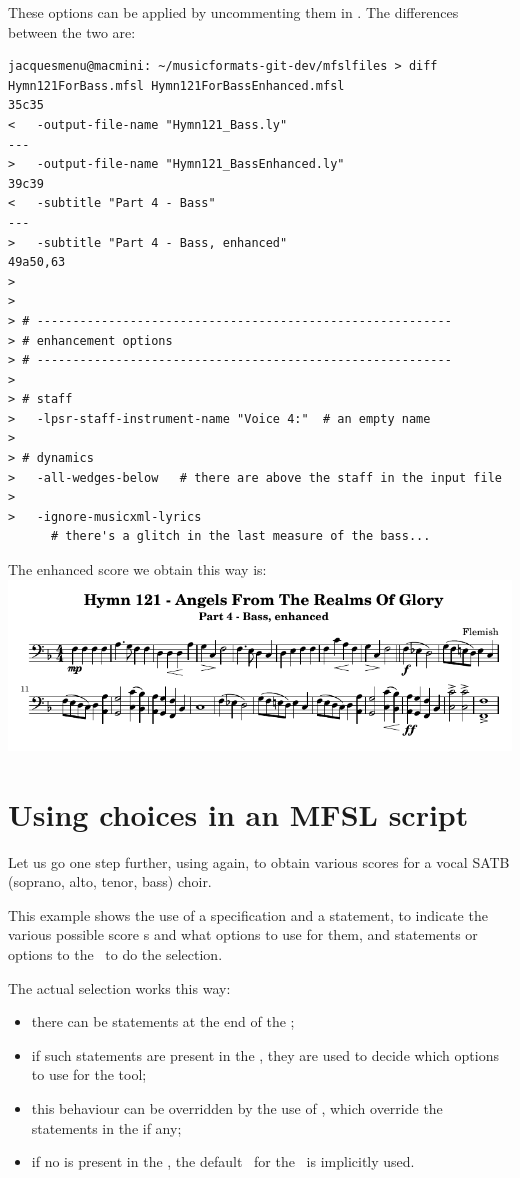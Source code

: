 These options can be applied by uncommenting them in . The differences between the two are:
\begin{lstlisting}[language=Terminal]
jacquesmenu@macmini: ~/musicformats-git-dev/mfslfiles > diff Hymn121ForBass.mfsl Hymn121ForBassEnhanced.mfsl
35c35
<   -output-file-name "Hymn121_Bass.ly"
---
>   -output-file-name "Hymn121_BassEnhanced.ly"
39c39
<   -subtitle "Part 4 - Bass"
---
>   -subtitle "Part 4 - Bass, enhanced"
49a50,63
>
>
> # ----------------------------------------------------------
> # enhancement options
> # ----------------------------------------------------------
>
> # staff
>   -lpsr-staff-instrument-name "Voice 4:"  # an empty name
>
> # dynamics
>   -all-wedges-below   # there are above the staff in the input file
>
>   -ignore-musicxml-lyrics
      # there's a glitch in the last measure of the bass...
\end{lstlisting}

The enhanced score we obtain this way is:\\
\includegraphics[scale=0.8]{../graphics/Hymn121_BassEnhanced.png}


\section{Using choices in an MFSL script}

Let us go one step further, using  again, to obtain various scores for a vocal SATB (soprano, alto, tenor, bass) choir.

This example shows the use of a  specification and a  statement, to indicate the various possible score \choice s and what options to use for them, and  statements or options to the \mfslInterp\ to do the selection.

The actual selection works this way:
\begin{itemize}
\item there can be  statements at the end of the \script;
\item if such statements are present in the \script, they are used to decide which options to use for the tool;
\item this behaviour can be overridden by the use of , which override the  statements in the \script if any;
\item if no  is present in the \script, the default \coiceLabel\ for the \choice\ is implicitly used.
\end{itemize}

